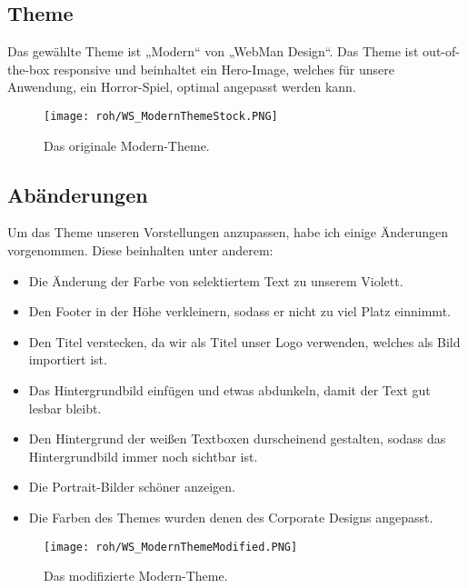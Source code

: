 \subsection{Theme}
Das gewählte Theme ist „Modern“ von „WebMan Design“. Das Theme ist out-of-the-box responsive und beinhaltet ein Hero-Image, welches für unsere Anwendung, ein Horror-Spiel, optimal angepasst werden kann. \citep{website:Theme}
\begin{figure}[H]
    \centering
    \texttt{[image: roh/WS\_ModernThemeStock.PNG]}
    \caption{Das originale Modern-Theme.}
    \label{WS:ModerThemeStock}
\end{figure}

\subsection{Abänderungen}
Um das Theme unseren Vorstellungen anzupassen, habe ich einige Änderungen vorgenommen. Diese beinhalten unter anderem:
\begin{itemize}
    \item Die Änderung der Farbe von selektiertem Text zu unserem Violett.
    \item Den Footer in der Höhe verkleinern, sodass er nicht zu viel Platz einnimmt.
    \item Den Titel verstecken, da wir als Titel unser Logo verwenden, welches als Bild importiert ist.
    \item Das Hintergrundbild einfügen und etwas abdunkeln, damit der Text gut lesbar bleibt.
    \item Den Hintergrund der weißen Textboxen durscheinend gestalten, sodass das Hintergrundbild immer noch sichtbar ist.
    \item Die Portrait-Bilder schöner anzeigen.
    \item Die Farben des Themes wurden denen des Corporate Designs angepasst.
\end{itemize}
\begin{figure}[H]
    \centering
    \texttt{[image: roh/WS\_ModernThemeModified.PNG]}
    \caption{Das modifizierte Modern-Theme.}
    \label{WS:ModerThemeModified}
\end{figure}